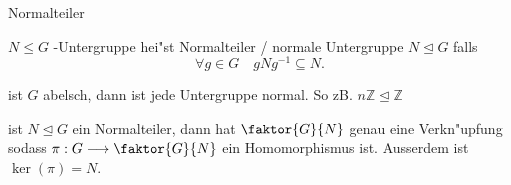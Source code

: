 \documentclass[class=article, crop=false]{standalone}
\begin{document}
\begin{zettel}{Normalteiler}
\begin{flashcard}
    \begin{definition}[Normalteiler]
        $N \leq G$ -Untergruppe hei"st Normalteiler / normale Untergruppe $N \trianglelefteq G$ falls
        \[
            \forall g \in  G \quad gNg^{-1}  \subseteq N 
        .\]
    \end{definition}
\end{flashcard}

\begin{remark}
    ist $G$ abelsch, dann ist jede Untergruppe normal. So zB.
  $n \mathbb{Z} \trianglelefteq \mathbb{Z}$
\end{remark}

\begin{theorem}
    ist $N \trianglelefteq G$ ein Normalteiler, dann hat $\faktor{G}{N}$ genau eine Verkn"upfung sodass $\pi : G \longrightarrow \faktor{G}{N}$ ein Homomorphismus ist. Ausserdem ist $ \ker ( \pi ) = N$.
\end{theorem}

\end{zettel}
\end{document}
